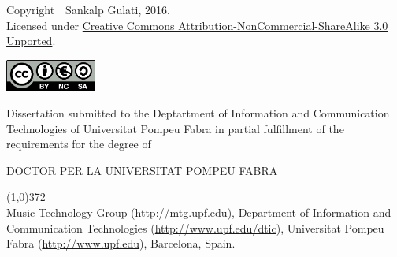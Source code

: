 \cleartorecto
\thispagestyle{empty}

{\footnotesize Copyright~\textcopyright~Sankalp Gulati, 2016.}
\\{\footnotesize Licensed under \href{http://creativecommons.org/licenses/by-nc-sa/3.0/}{Creative Commons Attribution-NonCommercial-ShareAlike 3.0 Unported}.}

\href{http://creativecommons.org/licenses/by-nc-sa/3.0/}{\includegraphics[width=3cm]{ch00/figures/creative-commons2.png}}


\vspace*{5cm}


Dissertation submitted to the Deptartment of Information and Communication Technologies of Universitat Pompeu Fabra in partial fulfillment of the requirements for the degree of

\vspace*{0.5cm}

\centerline{DOCTOR PER LA UNIVERSITAT POMPEU FABRA}

\vspace*{0.6cm}



\vspace*{\fill}

\line(1,0){372}\\
\footnotesize
Music Technology Group (\url{http://mtg.upf.edu}), Department of Information and Communication Technologies (\url{http://www.upf.edu/dtic}), Universitat Pompeu Fabra (\url{http://www.upf.edu}), Barcelona, Spain.
\normalsize


%




